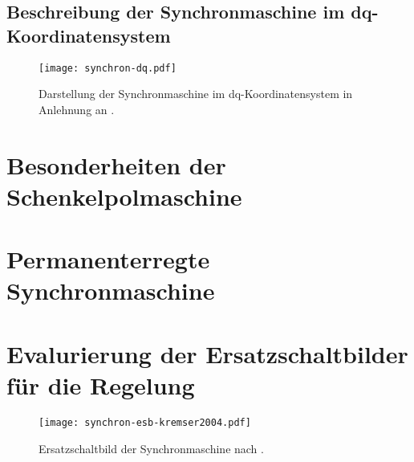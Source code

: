 \subsection{Beschreibung der Synchronmaschine im dq-Koordinatensystem}

\begin{figure}[!htb]
\centering
\texttt{[image: synchron-dq.pdf]}
\label{fig:synchron-dq}
\caption{Darstellung der Synchronmaschine im dq-Koordinatensystem in Anlehnung an \parencite[S.~257]{schroeder2000}.}
\end{figure}

\section{Besonderheiten der Schenkelpolmaschine}\label{sec:schenkelpol}

\section{Permanenterregte Synchronmaschine}\label{sec:pmsm}

\section{Evalurierung der Ersatzschaltbilder für die Regelung}\label{sec:esb}

\begin{figure}[!htb]
\centering
\texttt{[image: synchron-esb-kremser2004.pdf]}
\label{fig:esb-kremser}
\caption{Ersatzschaltbild der Synchronmaschine nach \parencite[S.~145]{kremser2004}.}
\end{figure}


